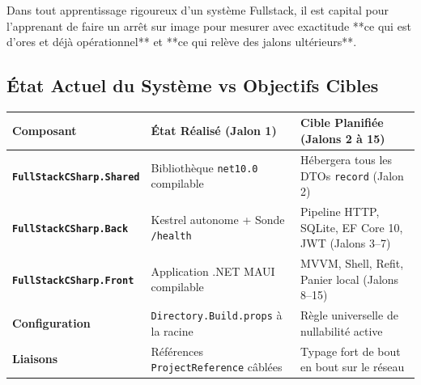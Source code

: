 \documentclass[a4paper,11pt]{report}
\begin{document}
\vspace{0.1cm}

Dans tout apprentissage rigoureux d'un système Fullstack, il est capital pour l'apprenant de faire un arrêt sur image pour mesurer avec exactitude **ce qui est d'ores et déjà opérationnel** et **ce qui relève des jalons ultérieurs**.

\vspace{0.2cm}

\subsection*{État Actuel du Système vs Objectifs Cibles}

\begin{table}[h!]
\centering
\small
\begin{tabularx}{\textwidth}{l p{5.5cm} X}
\toprule
\textbf{Composant} & \textbf{État Réalisé (Jalon 1)} & \textbf{Cible Planifiée (Jalons 2 à 15)} \\
\midrule
\textbf{\texttt{FullStackCSharp.Shared}} & Bibliothèque \texttt{net10.0} compilable & Hébergera tous les DTOs \texttt{record} (Jalon 2) \\
\textbf{\texttt{FullStackCSharp.Back}} & Kestrel autonome + Sonde \texttt{/health} & Pipeline HTTP, SQLite, EF Core 10, JWT (Jalons 3--7) \\
\textbf{\texttt{FullStackCSharp.Front}} & Application .NET MAUI compilable & MVVM, Shell, Refit, Panier local (Jalons 8--15) \\
\textbf{Configuration} & \texttt{Directory.Build.props} à la racine & Règle universelle de nullabilité active \\
\textbf{Liaisons} & Références \texttt{ProjectReference} câblées & Typage fort de bout en bout sur le réseau \\
\bottomrule
\end{tabularx}
\end{table}

\vspace{0.2cm}
\end{document}
